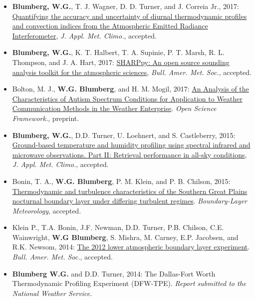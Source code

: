 \documentclass[10pt]{res} %
\begin{document}
\begin{resume}
\vspace{15pt} %
\begin{itemize} \itemsep 2pt %
\item \textbf{Blumberg, W.G.}, T. J. Wagner, D. D. Turner, and J. Correia Jr., 2017: \href{http://journals.ametsoc.org/doi/abs/10.1175/JAMC-D-17-0036.1}{Quantifying the accuracy and uncertainty of diurnal thermodynamic profiles and convection indices from the Atmospheric Emitted Radiance Interferometer}, \emph{J. Appl. Met. Climo.}, accepted.
\item \textbf{Blumberg, W.G.}, K. T. Halbert, T. A. Supinie, P. T. Marsh, R. L. Thompson, and J. A. Hart, 2017: \href{http://journals.ametsoc.org/doi/abs/10.1175/BAMS-D-15-00309.1}{SHARPpy: An open source sounding analysis toolkit for the atmospheric sciences}, \emph{Bull. Amer. Met. Soc.}, accepted.
\item Bolton, M. J., \textbf{W.G. Blumberg}, and H. M. Mogil, 2017: \href{https://osf.io/52nqd}{An Analysis of the Characteristics of Autism Spectrum Conditions for Application to Weather Communication Methods in the Weather Enterprise}. \emph{Open Science Framework.}, preprint. 
\item \textbf{Blumberg, W.G.}, D.D. Turner, U. Loehnert, and S. Castleberry, 2015: \href{http://journals.ametsoc.org/doi/abs/10.1175/JAMC-D-15-0005.1}{Ground-based temperature and humidity profiling using spectral infrared and microwave observations.  Part II: Retrieval performance in all-sky conditions}, \emph{J. Appl. Met. Climo.}, accepted.
\item Bonin, T. A., \textbf{W.G. Blumberg}, P. M. Klein, and P. B. Chilson, 2015: \href{http://link.springer.com/article/10.1007/s10546-015-0072-2}{Thermodynamic and turbulence characteristics of the Southern Great Plains nocturnal boundary layer under differing turbulent regimes}. \emph{Boundary-Layer Meteorology}, accepted.
\item Klein P., T.A. Bonin, J.F. Newman,  D.D. Turner, P.B. Chilson, C.E. Wainwright, \textbf{W.G Blumberg}, S. Mishra, M. Carney,  E.P. Jacobsen, and R.K. Newsom, 2014: \href{http://journals.ametsoc.org/doi/abs/10.1175/BAMS-D-13-00267.1}{The 2012 lower atmospheric boundary layer experiment}. \emph{Bull. Amer. Met. Soc.}, accepted.
\item \textbf{Blumberg W.G.} and D.D. Turner, 2014: The Dallas-Fort Worth Thermodynamic Profiling Experiment (DFW-TPE). \emph{Report submitted to the National Weather Service}.
\end{itemize}


\end{resume}
\end{document}
